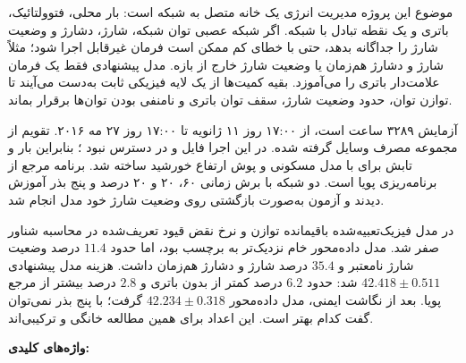 
موضوع این پروژه مدیریت انرژی یک خانه متصل به شبکه است: بار محلی، فتوولتائیک، باتری و یک نقطه تبادل با شبکه. اگر شبکه عصبی توان شبکه، شارژ، دشارژ و وضعیت شارژ را جداگانه بدهد، حتی با خطای کم ممکن است فرمان غیرقابل اجرا شود؛ مثلاً شارژ و دشارژ هم‌زمان یا وضعیت شارژ خارج از بازه. مدل پیشنهادی فقط یک فرمان علامت‌دار باتری را می‌آموزد. بقیه کمیت‌ها از یک لایه فیزیکی ثابت به‌دست می‌آیند تا توازن توان، حدود وضعیت شارژ، سقف توان باتری و نامنفی بودن توان‌ها برقرار بماند.

آزمایش ۳۲۸۹ ساعت است، از ۱۷:۰۰ روز ۱۱ ژانویه تا ۱۷:۰۰ روز ۲۷ مه ۲۰۱۶. تقویم از مجموعه مصرف وسایل  گرفته شده. در این اجرا فایل  و  در دسترس نبود ؛ بنابراین بار و تابش برای  با مدل مسکونی و پوش ارتفاع خورشید ساخته شد. برنامه مرجع از برنامه‌ریزی پویا است. دو شبکه با برش زمانی ۶۰، ۲۰ و ۲۰ درصد و پنج بذر آموزش دیدند و آزمون به‌صورت بازگشتی روی وضعیت شارژ خود مدل انجام شد.

در مدل فیزیک‌تعبیه‌شده باقیمانده توازن و نرخ نقض قیود تعریف‌شده در محاسبه شناور صفر شد. مدل داده‌محور خام نزدیک‌تر به برچسب بود، اما حدود $11{.}4$ درصد وضعیت شارژ نامعتبر و $35{.}4$ درصد شارژ و دشارژ هم‌زمان داشت. هزینه مدل پیشنهادی $42{.}418 \pm 0{.}511$ شد: حدود $6{.}2$ درصد کمتر از بدون باتری و $2{.}8$ درصد بیشتر از مرجع پویا. بعد از نگاشت ایمنی، مدل داده‌محور $42{.}234 \pm 0{.}318$ گرفت؛ با پنج بذر نمی‌توان گفت کدام بهتر است. این اعداد برای همین مطالعه خانگی و ترکیبی‌اند.

\vspace{0.6cm}
\noindent\textbf{واژه‌های کلیدی:} \KeywordsFa
